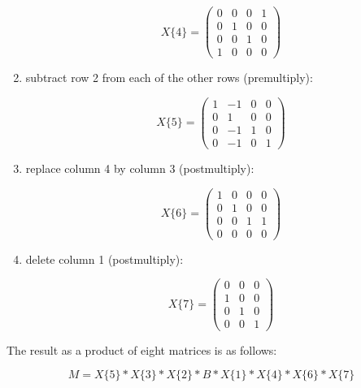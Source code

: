 \begin{enumerate}
  \begin{equation}
    X\{4\} = 
    \begin{pmatrix}
      0 & 0 & 0 & 1 \\
      0 & 1 & 0 & 0 \\
      0 & 0 & 1 & 0 \\
      1 & 0 & 0 & 0
    \end{pmatrix}
  \end{equation}

\item subtract row 2 from each of the other rows (premultiply):

  \begin{equation}
    X\{5\} = 
    \begin{pmatrix}
      1 & -1 & 0 & 0 \\
      0 & 1 & 0 & 0 \\
      0 & -1 & 1 & 0 \\
      0 & -1 & 0 & 1
    \end{pmatrix}
  \end{equation}

\item replace column 4 by column 3 (postmultiply):

  \begin{equation}
    X\{6\} = 
    \begin{pmatrix}
      1 & 0 & 0 & 0 \\
      0 & 1 & 0 & 0 \\
      0 & 0 & 1 & 1 \\
      0 & 0 & 0 & 0
    \end{pmatrix}
  \end{equation}

\item delete column 1 (postmultiply):

  \begin{equation}
    X\{7\} = 
    \begin{pmatrix}
      0 & 0 & 0 \\
      1 & 0 & 0 \\
      0 & 1 & 0 \\
      0 & 0 & 1
    \end{pmatrix}
  \end{equation}

\end{enumerate}

The result as a product of eight matrices is as follows:

\begin{equation}
  \boxed{M = X\{5\}*X\{3\}*X\{2\}*B*X\{1\}*X\{4\}*X\{6\}*X\{7\}}
  \label{eq:1a}
\end{equation}

